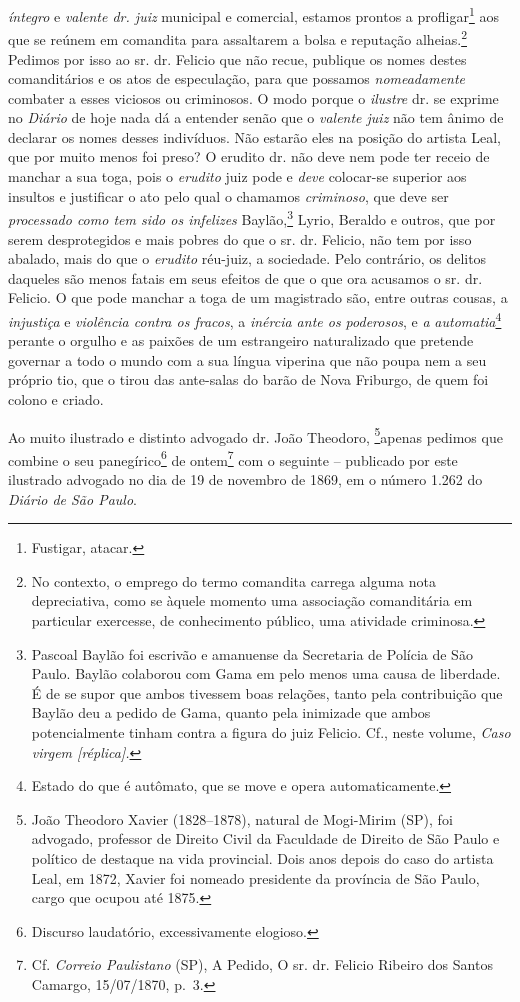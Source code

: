 \emph{íntegro} e \emph{valente dr. juiz} municipal e comercial, estamos
prontos a profligar\footnote{ Fustigar, atacar.} aos que se reúnem em
comandita para assaltarem a bolsa e reputação alheias.\footnote{ No
  contexto, o emprego do termo comandita carrega alguma nota
  depreciativa, como se àquele momento uma associação comanditária em
  particular exercesse, de conhecimento público, uma atividade
  criminosa.} Pedimos por isso ao sr. dr. Felicio que não recue,
publique os nomes destes comanditários e os atos de especulação, para
que possamos \emph{nomeadamente} combater a esses viciosos ou
criminosos. O modo porque o \emph{ilustre} dr. se exprime no
\emph{Diário} de hoje nada dá a entender senão que o \emph{valente juiz}
não tem ânimo de declarar os nomes desses indivíduos. Não estarão eles
na posição do artista Leal, que por muito menos foi preso? O erudito dr.
não deve nem pode ter receio de manchar a sua toga, pois o
\emph{erudito} juiz pode e \emph{deve} colocar-se superior aos insultos
e justificar o ato pelo qual o chamamos \emph{criminoso}, que deve ser
\emph{processado como tem sido os infelizes} Baylão,\footnote{ Pascoal
  Baylão foi escrivão e amanuense da Secretaria de Polícia de São Paulo.
  Baylão colaborou com Gama em pelo menos uma causa de liberdade. É de
  se supor que ambos tivessem boas relações, tanto pela contribuição que
  Baylão deu a pedido de Gama, quanto pela inimizade que ambos
  potencialmente tinham contra a figura do juiz Felicio. Cf., neste
  volume, \emph{Caso virgem {[}réplica{]}.}} Lyrio, Beraldo e outros,
que por serem desprotegidos e mais pobres do que o sr. dr. Felicio, não
tem por isso abalado, mais do que o \emph{erudito} réu-juiz, a
sociedade. Pelo contrário, os delitos daqueles são menos fatais em seus
efeitos de que o que ora acusamos o sr. dr. Felicio. O que pode manchar
a toga de um magistrado são, entre outras cousas, a \emph{injustiça} e
\emph{violência contra os fracos}, a \emph{inércia ante os poderosos}, e
\emph{a} \emph{automatia}\footnote{ Estado do que é autômato, que se
  move e opera automaticamente.} perante o orgulho e as paixões de um
estrangeiro naturalizado que pretende governar a todo o mundo com a sua
língua viperina que não poupa nem a seu próprio tio, que o tirou das
ante-salas do barão de Nova Friburgo, de quem foi colono e criado.

Ao muito ilustrado e distinto advogado dr. João Theodoro,
\footnote{ João Theodoro Xavier (1828--1878), natural de Mogi-Mirim
  (SP), foi advogado, professor de Direito Civil da Faculdade de Direito
  de São Paulo e político de destaque na vida provincial. Dois anos
  depois do caso do artista Leal, em 1872, Xavier foi nomeado presidente
  da província de São Paulo, cargo que ocupou até 1875.}apenas pedimos
que combine o seu panegírico\footnote{ Discurso laudatório,
  excessivamente elogioso.} de ontem\footnote{ Cf. \emph{Correio
  Paulistano} (SP), A Pedido, O sr. dr. Felicio Ribeiro dos Santos
  Camargo, 15/07/1870, p.~3.} com o seguinte -- publicado por este
ilustrado advogado no dia de 19 de novembro de 1869, em o número 1.262
do \emph{Diário de São Paulo}.

